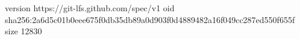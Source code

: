 version https://git-lfs.github.com/spec/v1
oid sha256:2a6d5c01b0eee675f0db35db89a0d903f0d4889482a16f049cc287ed550f655f
size 12830

